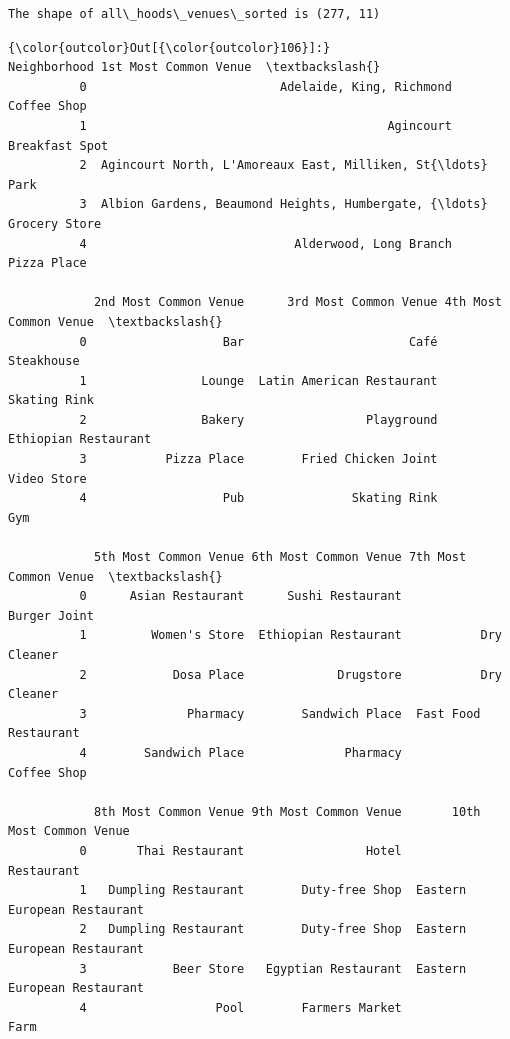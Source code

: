 \documentclass[11pt]{article}
\begin{document}
    \begin{Verbatim}[commandchars=\\\{\}]
The shape of all\_hoods\_venues\_sorted is (277, 11)

    \end{Verbatim}

\begin{Verbatim}[commandchars=\\\{\}]
{\color{outcolor}Out[{\color{outcolor}106}]:}                                         Neighborhood 1st Most Common Venue  \textbackslash{}
          0                           Adelaide, King, Richmond           Coffee Shop   
          1                                          Agincourt        Breakfast Spot   
          2  Agincourt North, L'Amoreaux East, Milliken, St{\ldots}                  Park   
          3  Albion Gardens, Beaumond Heights, Humbergate, {\ldots}         Grocery Store   
          4                             Alderwood, Long Branch           Pizza Place   
          
            2nd Most Common Venue      3rd Most Common Venue 4th Most Common Venue  \textbackslash{}
          0                   Bar                       Café            Steakhouse   
          1                Lounge  Latin American Restaurant          Skating Rink   
          2                Bakery                 Playground  Ethiopian Restaurant   
          3           Pizza Place        Fried Chicken Joint           Video Store   
          4                   Pub               Skating Rink                   Gym   
          
            5th Most Common Venue 6th Most Common Venue 7th Most Common Venue  \textbackslash{}
          0      Asian Restaurant      Sushi Restaurant          Burger Joint   
          1         Women's Store  Ethiopian Restaurant           Dry Cleaner   
          2            Dosa Place             Drugstore           Dry Cleaner   
          3              Pharmacy        Sandwich Place  Fast Food Restaurant   
          4        Sandwich Place              Pharmacy           Coffee Shop   
          
            8th Most Common Venue 9th Most Common Venue       10th Most Common Venue  
          0       Thai Restaurant                 Hotel                   Restaurant  
          1   Dumpling Restaurant        Duty-free Shop  Eastern European Restaurant  
          2   Dumpling Restaurant        Duty-free Shop  Eastern European Restaurant  
          3            Beer Store   Egyptian Restaurant  Eastern European Restaurant  
          4                  Pool        Farmers Market                         Farm  
\end{Verbatim}
            
\end{document}
